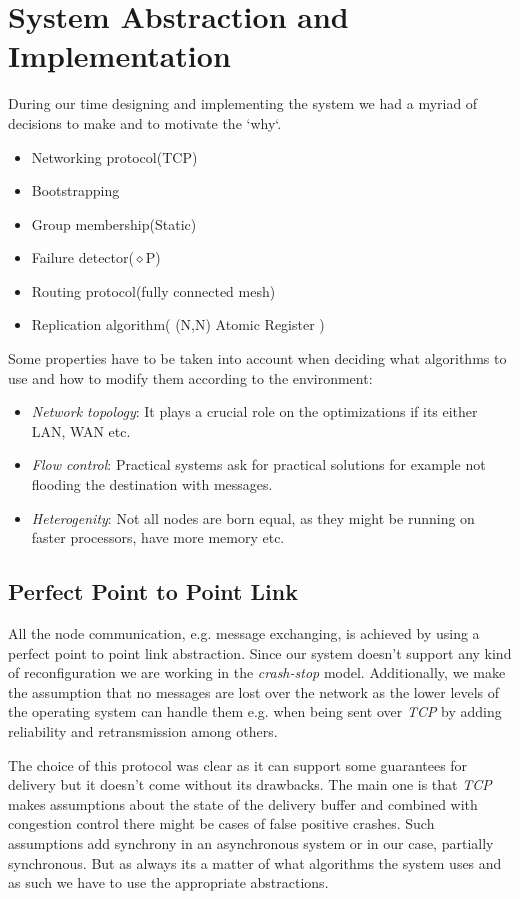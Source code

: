 \documentclass[a4paper, 11pt]{article}
\begin{document}
\section{System Abstraction and Implementation}

During our time designing and implementing the system we had a myriad of decisions to make and to motivate the `why`.

\begin{itemize}
	\item Networking protocol(TCP)
	\item Bootstrapping
	\item Group membership(Static)
	\item Failure detector($\diamond$P)
	\item Routing protocol(fully connected mesh)
	\item Replication algorithm( (N,N) Atomic Register )
\end{itemize}

Some properties have to be taken into account when deciding what algorithms to use and how to modify them according to the environment:
\begin{itemize}
	\item \textit{Network topology}: It plays a crucial role on the optimizations if its either LAN, WAN etc.
	\item \textit{Flow control}: Practical systems ask for practical solutions for example not flooding the destination with messages.
	\item \textit{Heterogenity}: Not all nodes are born equal, as they might be running on faster processors, have more memory etc.
\end{itemize}

\subsection{Perfect Point to Point Link}

All the node communication, e.g. message exchanging, is achieved by using a perfect point to point link abstraction. Since our system doesn't support any kind of reconfiguration we are working in the \textit{crash-stop} model. Additionally, we make the assumption that no messages are lost over the network as the lower levels of the operating system can handle them e.g. when being sent over \textit{TCP} by adding reliability and retransmission among others. \par 

The choice of this protocol was clear as it can support some guarantees for delivery but it doesn't come without its drawbacks. The main one is that \textit{TCP} makes assumptions about the state of the delivery buffer and combined with congestion control there might be cases of false positive crashes. Such assumptions add synchrony in an asynchronous system or in our case, partially synchronous. But as always its a matter of what algorithms the system uses and as such we have to use the appropriate abstractions. \par 
\end{document}
